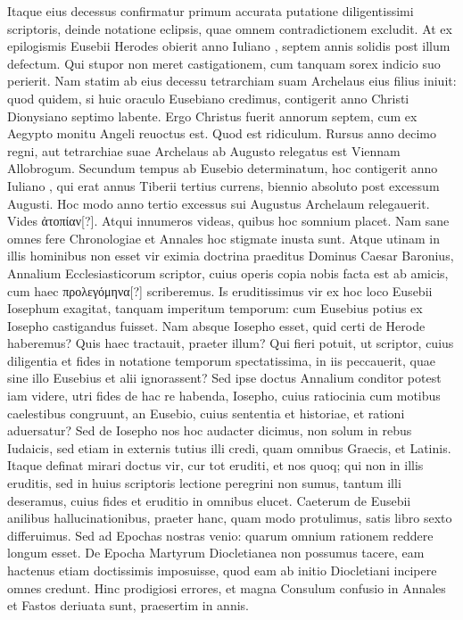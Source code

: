 Itaque eius decessus confirmatur primum accurata putatione
diligentissimi scriptoris, deinde notatione eclipsis, quae omnem contradictionem
excludit.
At ex epilogismis Eusebii Herodes obierit
anno Iuliano , septem annis solidis post illum defectum.
Qui stupor non meret castigationem, cum tanquam sorex indicio
 suo perierit.
Nam statim ab eius decessu tetrarchiam suam Archelaus eius filius
iniuit: quod quidem, si huic oraculo Eusebiano credimus, contigerit
anno Christi Dionysiano septimo labente.
Ergo Christus fuerit
annorum septem, cum ex Aegypto monitu Angeli reuoctus est.
Quod est ridiculum.
Rursus anno decimo regni, aut tetrarchiae suae
Archelaus ab Augusto relegatus est Viennam Allobrogum.
Secundum tempus ab Eusebio determinatum, hoc contigerit anno Iuliano
, qui erat annus Tiberii tertius currens, biennio absoluto
post excessum Augusti.
Hoc modo anno tertio excessus sui Augustus
Archelaum relegauerit.
Vides \textgreek{ἀτοπίαν[?]}.
Atqui innumeros videas,
quibus hoc somnium placet.
Nam sane omnes fere Chronologiae
et Annales hoc stigmate inusta sunt.
Atque utinam in illis hominibus
non esset vir eximia doctrina praeditus Dominus Caesar Baronius,
Annalium Ecclesiasticorum scriptor, cuius operis copia nobis
facta est ab amicis, cum haec \textgreek{προλεγόμηνα[?]} scriberemus.
Is eruditissimus
vir ex hoc loco Eusebii Iosephum exagitat, tanquam imperitum
temporum: cum Eusebius potius ex Iosepho castigandus fuisset.
Nam absque Iosepho esset, quid certi de Herode haberemus?
Quis haec tractauit, praeter illum?
Qui fieri potuit, ut scriptor, cuius diligentia
et fides in notatione temporum spectatissima, in iis peccauerit,
quae sine illo Eusebius et alii ignorassent?
Sed ipse doctus Annalium
conditor potest iam videre, utri fides de hac re habenda, Iosepho,
cuius ratiocinia cum motibus caelestibus congruunt, an Eusebio,
cuius sententia et historiae, et rationi aduersatur?
Sed de Iosepho
nos hoc audacter dicimus, non solum in rebus Iudaicis, sed etiam
in externis tutius illi credi, quam omnibus Graecis, et Latinis.
Itaque
definat mirari doctus vir, cur tot eruditi, et nos quoq; qui non in illis
eruditis, sed in huius scriptoris lectione peregrini non sumus, tantum
illi deseramus, cuius fides et eruditio in omnibus elucet.
Caeterum de Eusebii anilibus hallucinationibus, praeter hanc, quam
modo protulimus, satis libro sexto differuimus.
Sed ad Epochas
nostras venio: quarum omnium rationem reddere longum esset.
De Epocha Martyrum Diocletianea non possumus tacere, eam hactenus
etiam doctissimis imposuisse, quod eam ab initio Diocletiani
incipere omnes credunt.
Hinc prodigiosi errores, et magna Consulum
confusio in Annales et Fastos deriuata sunt, praesertim in annis.

